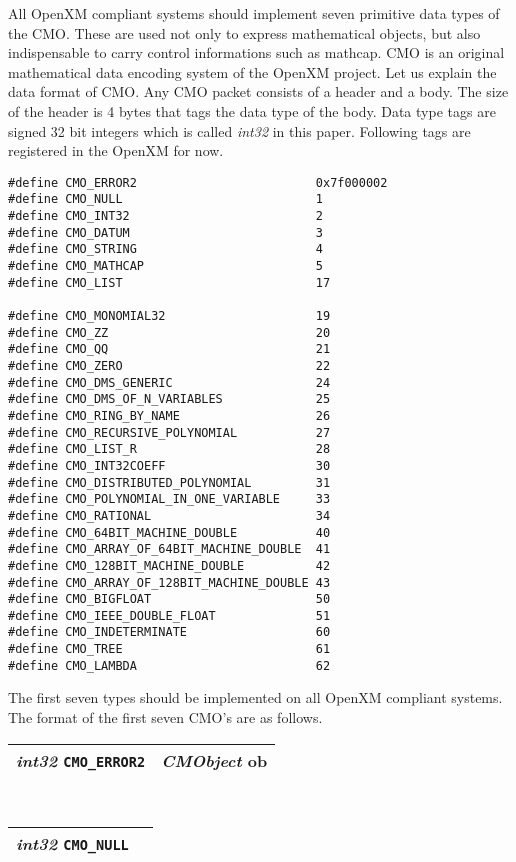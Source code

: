 All OpenXM compliant systems should implement seven primitive data types
of the CMO.
These are used not only to express mathematical objects, but also
indispensable to carry control informations such as mathcap.
CMO is an original mathematical data encoding system of the OpenXM project.
Let us explain the data format of CMO.
Any CMO packet consists of a header and a body.
The size of the header is 4 bytes that tags the data type of the body.
Data type tags are signed 32 bit integers which is called {\sl int32} in this
paper.
Following tags are registered in the OpenXM for now.
\begin{verbatim}
#define CMO_ERROR2                         0x7f000002
#define CMO_NULL                           1
#define CMO_INT32                          2
#define CMO_DATUM                          3
#define CMO_STRING                         4
#define CMO_MATHCAP                        5
#define CMO_LIST                           17

#define CMO_MONOMIAL32                     19
#define CMO_ZZ                             20
#define CMO_QQ                             21
#define CMO_ZERO                           22
#define CMO_DMS_GENERIC                    24
#define CMO_DMS_OF_N_VARIABLES             25
#define CMO_RING_BY_NAME                   26
#define CMO_RECURSIVE_POLYNOMIAL           27
#define CMO_LIST_R                         28
#define CMO_INT32COEFF                     30
#define CMO_DISTRIBUTED_POLYNOMIAL         31
#define CMO_POLYNOMIAL_IN_ONE_VARIABLE     33
#define CMO_RATIONAL                       34
#define CMO_64BIT_MACHINE_DOUBLE           40
#define CMO_ARRAY_OF_64BIT_MACHINE_DOUBLE  41
#define CMO_128BIT_MACHINE_DOUBLE          42
#define CMO_ARRAY_OF_128BIT_MACHINE_DOUBLE 43
#define CMO_BIGFLOAT                       50
#define CMO_IEEE_DOUBLE_FLOAT              51
#define CMO_INDETERMINATE                  60
#define CMO_TREE                           61
#define CMO_LAMBDA                         62
\end{verbatim}
The first seven types should be implemented on all OpenXM compliant systems.
The format of the first seven CMO's are as follows. \\
\begin{tabular}{|c|c|}
\hline
{\sl int32} {\tt CMO\_ERROR2} & {\sl CMObject} {\rm ob} \\ 
\hline
\end{tabular} \\
\begin{tabular}{|c|c|}
\hline
{\sl int32} {\tt CMO\_NULL}  \\ 
\hline
\end{tabular} \\
